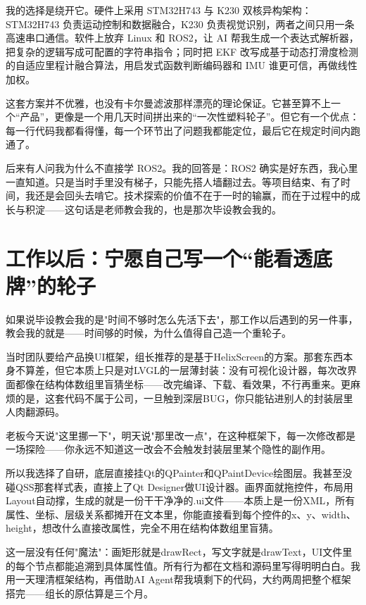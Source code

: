 我的选择是绕开它。硬件上采用 STM32H743 与 K230 双核异构架构：STM32H743 负责运动控制和数据融合，K230 负责视觉识别，两者之间只用一条高速串口通信。软件上放弃 Linux 和 ROS2，让 AI 帮我生成一个表达式解析器，把复杂的逻辑写成可配置的字符串指令；同时把 EKF 改写成基于动态打滑度检测的自适应里程计融合算法，用启发式函数判断编码器和 IMU 谁更可信，再做线性加权。

这套方案并不优雅，也没有卡尔曼滤波那样漂亮的理论保证。它甚至算不上一个“产品”，更像是一个用几天时间拼出来的“一次性塑料轮子”。但它有一个优点：每一行代码我都看得懂，每一个环节出了问题我都能定位，最后它在规定时间内跑通了。

后来有人问我为什么不直接学 ROS2。我的回答是：ROS2 确实是好东西，我心里一直知道。只是当时手里没有梯子，只能先搭人墙翻过去。等项目结束、有了时间，我还是会回头去啃它。技术探索的价值不在于一时的输赢，而在于过程中的成长与积淀——这句话是老师教会我的，也是那次毕设教会我的。

\section{工作以后：宁愿自己写一个“能看透底牌”的轮子}

如果说毕设教会我的是"时间不够时怎么先活下去"，那工作以后遇到的另一件事，教会我的就是——时间够的时候，为什么值得自己造一个重轮子。

当时团队要给产品换UI框架，组长推荐的是基于HelixScreen的方案。那套东西本身不算差，但它本质上只是对LVGL的一层薄封装：没有可视化设计器，每次改界面都像在结构体数组里盲猜坐标——改完编译、下载、看效果，不行再重来。更麻烦的是，这套代码不属于公司，一旦触到深层BUG，你只能钻进别人的封装层里人肉翻源码。

老板今天说"这里挪一下"，明天说"那里改一点"，在这种框架下，每一次修改都是一场探险——你永远不知道这一改会不会触发封装层里某个隐性的副作用。

所以我选择了自研，底层直接挂Qt的QPainter和QPaintDevice绘图层。我甚至没碰QSS那套样式表，直接上了Qt Designer做UI设计器。画界面就拖控件，布局用Layout自动撑，生成的就是一份干干净净的.ui文件——本质上是一份XML，所有属性、坐标、层级关系都摊开在文本里，你能直接看到每个控件的x、y、width、height，想改什么直接改属性，完全不用在结构体数组里盲猜。

这一层没有任何"魔法"：画矩形就是drawRect，写文字就是drawText，UI文件里的每个节点都能追溯到具体属性值。所有行为都在文档和源码里写得明明白白。我用一天理清框架结构，再借助AI Agent帮我填剩下的代码，大约两周把整个框架搭完——组长的原估算是三个月。

